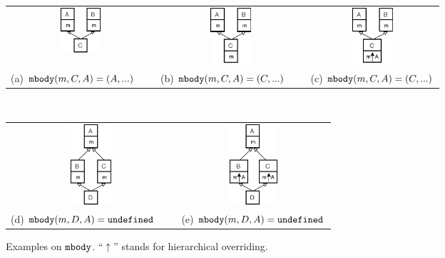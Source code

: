 \begin{figure}[t]
    \centering
    \vspace{-1ex}
    \begin{tabular}{ccc}
        \includegraphics[width=1.5cm]{pics/P1.pdf}\hspace{4pt} &
        \includegraphics[width=1.5cm]{pics/P2.pdf}\hspace{4pt} &
        \includegraphics[width=1.5cm]{pics/P3.pdf}\hspace{4pt} \\
        (a) $\texttt{mbody}(m,C,A) = (A,...)$\ \ \  & (b) $\texttt{mbody}(m,C,A) = (C,...)$\ \ \  & (c) $\texttt{mbody}(m,C,A) = (C,...)$
    \end{tabular} \\
   \begin{tabular}{cc}
    \includegraphics[height=3cm]{pics/P4.pdf}\hspace{4pt} &
    \includegraphics[height=3cm]{pics/P5.pdf}\hspace{4pt} \\ 
    (d) $\texttt{mbody}(m,D,A) = \texttt{undefined}$\ \ \  & (e) $\texttt{mbody}(m,D,A) = \texttt{undefined}$
   \end{tabular}
    \caption{Examples on $\texttt{mbody}$. ``$\uparrow$'' stands for hierarchical overriding.}\label{fig:examplesmbody}
\end{figure}

